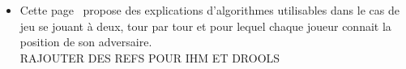 \documentclass[12pt]{article}
\begin{document}
\begin{itemize}
		\item Cette page~\cite{ref12} propose des explications d'algorithmes utilisables dans le cas de jeu se jouant à deux, tour par tour et pour lequel chaque joueur connait la position de son adversaire.
		~~\\
		
		RAJOUTER DES REFS POUR IHM ET DROOLS


	\end{itemize}
	
	
	{}
\end{document}

